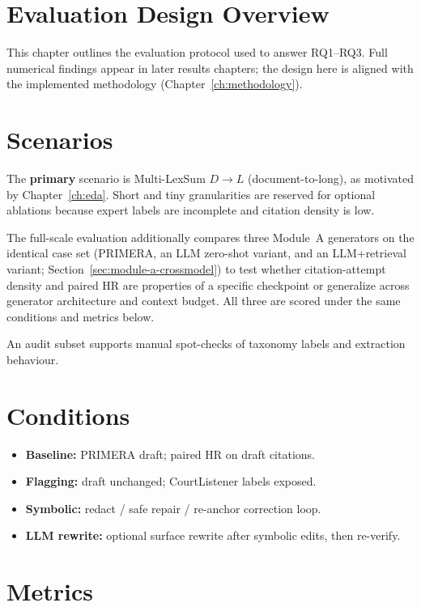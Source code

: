 \label{ch:evaluation-method}
\section{Evaluation Design Overview}

This chapter outlines the evaluation protocol used to answer RQ1--RQ3. Full numerical findings appear in later results chapters; the design here is aligned with the implemented methodology (Chapter~\ref{ch:methodology}).

\section{Scenarios}

The \textbf{primary} scenario is Multi-LexSum $D\rightarrow L$ (document-to-long), as motivated by Chapter~\ref{ch:eda}. Short and tiny granularities are reserved for optional ablations because expert labels are incomplete and citation density is low.

The full-scale evaluation additionally compares three Module~A generators on the identical case set (PRIMERA, an LLM zero-shot variant, and an LLM+retrieval variant; Section~\ref{sec:module-a-crossmodel}) to test whether citation-attempt density and paired HR are properties of a specific checkpoint or generalize across generator architecture and context budget. All three are scored under the same conditions and metrics below.

An audit subset supports manual spot-checks of taxonomy labels and extraction behaviour.

\section{Conditions}

\begin{itemize}
  \item \textbf{Baseline:} PRIMERA draft; paired HR on draft citations.
  \item \textbf{Flagging:} draft unchanged; CourtListener labels exposed.
  \item \textbf{Symbolic:} redact / safe repair / re-anchor correction loop.
  \item \textbf{LLM rewrite:} optional surface rewrite after symbolic edits, then re-verify.
\end{itemize}

\section{Metrics}

